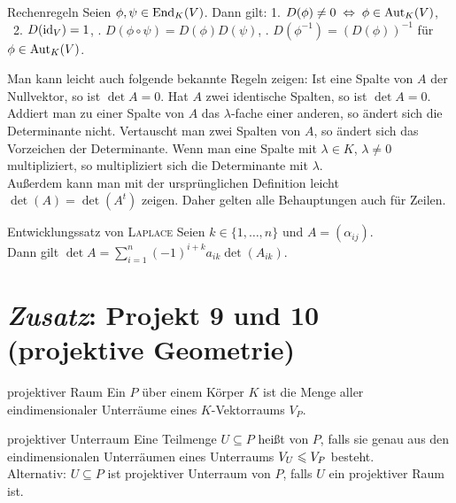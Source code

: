 \begin{Satz}{Rechenregeln}
    Seien $\phi, \psi \in \operatorname{End}_K(V)$.
    Dann gilt:
    1. $D(\phi) \not= 0 \;\Leftrightarrow\; \phi \in \operatorname{Aut}_K(V)$, \\\
    2. $D(\operatorname{id}_V) = 1$, . $D(\phi \circ \psi) = D(\phi) D(\psi)$, . $D(\phi^{-1}) = (D(\phi))^{-1}$ für $\phi \in \operatorname{Aut}_K(V)$.
\end{Satz}

\pagebreak

\begin{Bem}
    Man kann leicht auch folgende bekannte Regeln zeigen:
    Ist eine Spalte von $A$ der Nullvektor, so ist $\det A = 0$.
    Hat $A$ zwei identische Spalten, so ist $\det A = 0$.
    Addiert man zu einer Spalte von $A$ das $\lambda$-fache einer anderen,
    so ändert sich die Determinante nicht.
    Vertauscht man zwei Spalten von $A$, so ändert sich das Vorzeichen
    der Determinante.
    Wenn man eine Spalte mit $\lambda \in K$, $\lambda \not= 0$ multipliziert,
    so multipliziert sich die Determinante mit $\lambda$. \\
    Außerdem kann man mit der ursprünglichen Definition leicht
    $\det(A) = \det(A^t)$ zeigen.
    Daher gelten alle Behauptungen auch für Zeilen.
\end{Bem}

\begin{Satz}{Entwicklungssatz von \textsc{Laplace}}
    Seien $k \in \{1, \dotsc, n\}$ und $A = (\alpha_{ij})$. \\
    Dann gilt $\det A = \sum_{i=1}^n (-1)^{i+k} a_{ik} \det(A_{ik})$.
\end{Satz}

\section{%
    \emph{Zusatz}: Projekt 9 und 10 (projektive Geometrie)%
}

\begin{Def}{projektiver Raum}
    Ein  $P$ über einem Körper $K$ ist die Menge aller
    eindimensionaler Unterräume eines $K$-Vektorraums $V_P$.
\end{Def}

\begin{Def}{projektiver Unterraum}
    Eine Teilmenge $U \subseteq P$ heißt  von
    $P$, falls sie genau aus den eindimensionalen Unterräumen eines Unterraums
    $V_U \leqslant V_P$ besteht. \\
    Alternativ: $U \subseteq P$ ist projektiver Unterraum von $P$, falls $U$
    ein projektiver Raum ist.
\end{Def}

